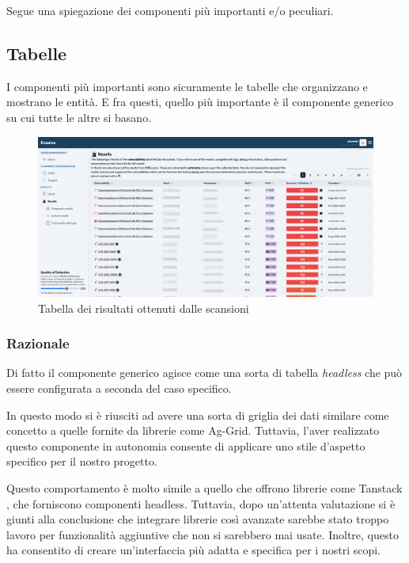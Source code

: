 Segue una spiegazione dei componenti più importanti e/o peculiari.

\subsection{Tabelle}
I componenti più importanti sono sicuramente le tabelle che organizzano e mostrano le entità. E fra questi, quello più importante è il componente generico su cui tutte le altre si basano.

\begin{figure}
\centering
\includegraphics[width=\textwidth]{img/results.png}
\caption{Tabella dei risultati ottenuti dalle scansioni}
\end{figure}

\subsubsection{Razionale}
Di fatto il componente generico agisce come una sorta di tabella \emph{headless} che può essere configurata a seconda del caso specifico.

In questo modo si è riusciti ad avere una sorta di griglia dei dati similare come concetto a quelle fornite da librerie come Ag-Grid. Tuttavia, l'aver realizzato questo componente in autonomia consente di applicare uno stile d'aspetto specifico per il nostro progetto.

Questo comportamento è molto simile a quello che offrono librerie come Tanstack \cite{tanstack}, che forniscono componenti headless. Tuttavia, dopo un'attenta valutazione si è giunti alla conclusione che integrare librerie così avanzate sarebbe stato troppo lavoro per funzionalità aggiuntive che non si sarebbero mai usate. Inoltre, questo ha consentito di creare un'interfaccia più adatta e specifica per i nostri scopi.

